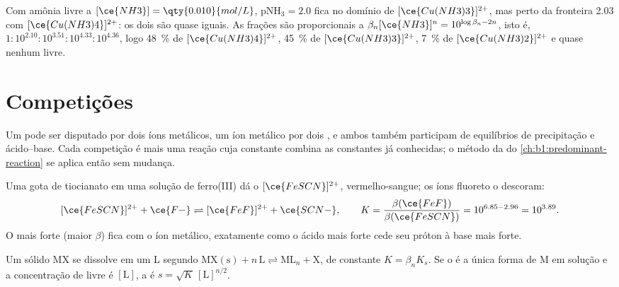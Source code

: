 \begin{example}\label{ex:b1:complexation:cu}
Com amônia livre a $[\ce{NH3}] = \qty{0.010}{mol/L}$, $\mathrm{pNH_3} = 2.0$ fica
no domínio de $[\ce{Cu(NH3)3}]^{2+}$, mas perto da fronteira 2.03 com
$[\ce{Cu(NH3)4}]^{2+}$: os dois são quase iguais. As frações são
proporcionais a $\beta_n[\ce{NH3}]^n = 10^{\log\beta_n - 2n}$, isto é,
$1 : 10^{2.10} : 10^{3.51} : 10^{4.33} : 10^{4.36}$, logo \qty{48}{\percent} de
$[\ce{Cu(NH3)4}]^{2+}$, \qty{45}{\percent} de $[\ce{Cu(NH3)3}]^{2+}$,
\qty{7}{\percent} de $[\ce{Cu(NH3)2}]^{2+}$ e quase nenhum  livre.
\end{example}

\section{Competições}

Um  pode ser disputado por dois íons metálicos, um íon metálico
por dois , e ambos também participam de equilíbrios de
precipitação e ácido--base. Cada competição é mais uma reação cuja
constante combina as constantes já conhecidas; o método da  do \cref{ch:b1:predominant-reaction} se aplica então sem
mudança.

\begin{example}\label{ex:b1:complexation:scn-f}
Uma gota de tiocianato em uma solução de ferro(III) dá o
$[\ce{FeSCN}]^{2+}$, vermelho-sangue; os íons fluoreto o descoram:
\[
  [\ce{FeSCN}]^{2+} + \ce{F-} \rightleftharpoons [\ce{FeF}]^{2+} + \ce{SCN-},
  \qquad K = \frac{\beta(\ce{FeF})}{\beta(\ce{FeSCN})} = 10^{6.85 - 2.96} =
  10^{3.89} .
\]
O  mais forte (maior $\beta$) fica com o íon metálico,
exatamente como o ácido mais forte cede seu próton à base mais forte.
\end{example}

\begin{proposition}\label{prop:b1:complexation:competition-precipitation}
Um sólido MX se dissolve em um  L segundo
$\mathrm{MX(s)} + n\,\mathrm{L} \rightleftharpoons \mathrm{ML}_n + \mathrm{X}$,
de constante $K = \beta_n K_s$. Se o  é a única forma de M em
solução e a concentração de  livre é $[\mathrm{L}]$, a
 é $s = \sqrt{K}\,[\mathrm{L}]^{n/2}$.
\end{proposition}

